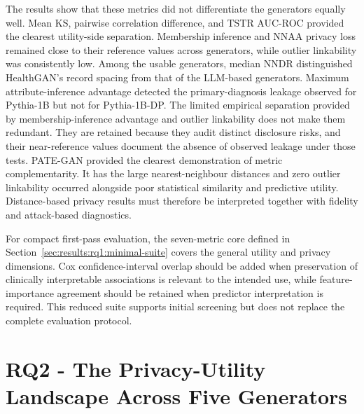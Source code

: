 The results show that these metrics did not differentiate 
the generators equally well. Mean KS, pairwise correlation difference, and TSTR
AUC-ROC provided the clearest utility-side separation. Membership
inference and NNAA privacy loss remained close to their reference values
across generators, while outlier linkability was consistently low.
Among the usable generators, median NNDR distinguished HealthGAN's 
record spacing from that of the LLM-based generators. Maximum 
attribute-inference advantage detected the primary-diagnosis leakage 
observed for Pythia-1B but not for Pythia-1B-DP. 
The limited empirical separation provided by membership-inference 
advantage and outlier linkability does not make them redundant. 
They are retained because they audit distinct disclosure risks, 
and their near-reference values document the absence of observed 
leakage under those tests. PATE-GAN provided 
the clearest demonstration of metric complementarity. It has the large 
nearest-neighbour distances and zero outlier linkability occurred 
alongside poor statistical similarity and predictive utility. 
Distance-based privacy results must therefore be
interpreted together with fidelity and attack-based diagnostics.

For compact first-pass evaluation, the seven-metric core defined in
Section~\ref{sec:results:rq1:minimal-suite} covers the general utility
and privacy dimensions. Cox confidence-interval overlap should be added
when preservation of clinically interpretable associations is relevant
to the intended use, while feature-importance agreement should be
retained when predictor interpretation is required. This reduced suite
supports initial screening but does not replace the complete evaluation
protocol.


\section{RQ2 - The Privacy-Utility Landscape Across Five Generators}
\label{sec:results:rq2}

%

